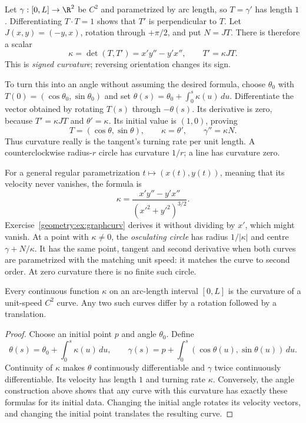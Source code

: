 Let $\gamma:[0,L]\to\R^2$ be $C^2$ and parametrized by arc length, so $T=\gamma'$ has length $1$. Differentiating $T\cdot T=1$ shows that $T'$ is perpendicular to $T$. Let $J(x,y)=(-y,x)$, rotation through $+\pi/2$, and put $N=JT$. There is therefore a scalar
\[
\kappa=\det(T,T')=x'y''-y'x'',\qquad T'=\kappa JT.
\]
This is \emph{signed curvature}; reversing orientation changes its sign.

To turn this into an angle without assuming the desired formula, choose $\theta_0$ with $T(0)=(\cos\theta_0,\sin\theta_0)$ and set $\theta(s)=\theta_0+\int_0^s\kappa(u)\,du$. Differentiate the vector obtained by rotating $T(s)$ through $-\theta(s)$. Its derivative is zero, because $T'=\kappa JT$ and $\theta'=\kappa$. Its initial value is $(1,0)$, proving
\[
T=(\cos\theta,\sin\theta),\qquad\kappa=\theta',\qquad\gamma''=\kappa N.
\]
Thus curvature really is the tangent's turning rate per unit length. A counterclockwise radius-$r$ circle has curvature $1/r$; a line has curvature zero.

For a general regular parametrization $t\mapsto(x(t),y(t))$, meaning that its velocity never vanishes, the formula is
\[
\kappa=\frac{x'y''-y'x''}{(x'^2+y'^2)^{3/2}}.
\]
Exercise~\ref{geometry:ex:graphcurv} derives it without dividing by $x'$, which might vanish. At a point with $\kappa\ne0$, the \emph{osculating circle} has radius $1/|\kappa|$ and centre $\gamma+N/\kappa$. It has the same point, tangent and second derivative when both curves are parametrized with the matching unit speed: it matches the curve to second order. At zero curvature there is no finite such circle.

\begin{theorem}\label{geometry:thm:fundcurve}
Every continuous function $\kappa$ on an arc-length interval $[0,L]$ is the curvature of a unit-speed $C^2$ curve. Any two such curves differ by a rotation followed by a translation.
\end{theorem}

\begin{proof}
Choose an initial point $p$ and angle $\theta_0$. Define
\[
\theta(s)=\theta_0+\int_0^s\kappa(u)\,du,
\qquad \gamma(s)=p+\int_0^s(\cos\theta(u),\sin\theta(u))\,du.
\]
Continuity of $\kappa$ makes $\theta$ continuously differentiable and $\gamma$ twice continuously differentiable. Its velocity has length $1$ and turning rate $\kappa$. Conversely, the angle construction above shows that any curve with this curvature has exactly these formulas for its initial data. Changing the initial angle rotates its velocity vectors, and changing the initial point translates the resulting curve.
\end{proof}

